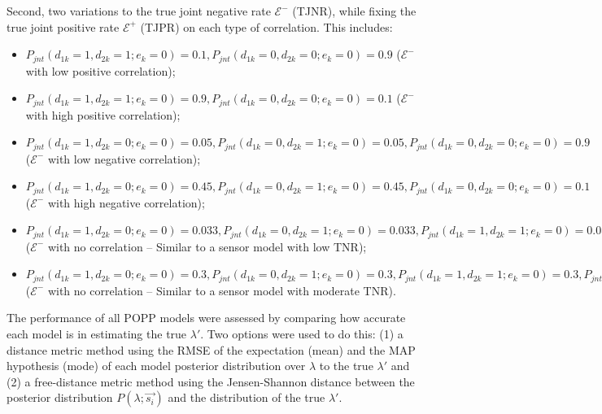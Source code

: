 Second, two variations to the true joint negative rate $\mathcal{E^-}$ (TJNR), while fixing the true joint positive rate $\mathcal{E^+}$ (TJPR) on each type of correlation. This includes: 
\begin{itemize}
	\item $P_{jnt}(d_{1k}=1, d_{2k}=1 ; e_k=0) = 0.1, P_{jnt}(d_{1k}=0, d_{2k}=0 ; e_k=0) = 0.9$ ($\mathcal{E^-}$ with low positive correlation);
	\item $P_{jnt}(d_{1k}=1, d_{2k}=1 ; e_k=0) = 0.9, P_{jnt}(d_{1k}=0, d_{2k}=0 ; e_k=0) = 0.1$ ($\mathcal{E^-}$ with high positive correlation);
	\item $P_{jnt}(d_{1k}=1, d_{2k}=0 ; e_k=0) = 0.05, P_{jnt}(d_{1k}=0, d_{2k}=1 ; e_k=0) = 0.05, P_{jnt}(d_{1k}=0, d_{2k}=0 ; e_k=0) = 0.9$ ($\mathcal{E^-}$ with low negative correlation);
	\item $P_{jnt}(d_{1k}=1, d_{2k}=0 ; e_k=0) = 0.45, P_{jnt}(d_{1k}=0, d_{2k}=1 ; e_k=0) = 0.45, P_{jnt}(d_{1k}=0, d_{2k}=0 ; e_k=0) = 0.1$ ($\mathcal{E^-}$ with high negative correlation);
	\item $P_{jnt}(d_{1k}=1, d_{2k}=0 ; e_k=0) = 0.033, P_{jnt}(d_{1k}=0, d_{2k}=1 ; e_k=0) = 0.033, P_{jnt}(d_{1k}=1, d_{2k}=1 ; e_k=0) = 0.033, P_{jnt}(d_{1k}=0, d_{2k}=0 ; e_k=1) = 0.901$ ($\mathcal{E^-}$ with no correlation -- Similar to a sensor model with low TNR);
	\item $P_{jnt}(d_{1k}=1, d_{2k}=0 ; e_k=0) = 0.3, P_{jnt}(d_{1k}=0, d_{2k}=1 ; e_k=0) = 0.3, P_{jnt}(d_{1k}=1, d_{2k}=1 ; e_k=0) = 0.3, P_{jnt}(d_{1k}=0, d_{2k}=0 ; e_k=1) = 0.1$ ($\mathcal{E^-}$ with no correlation -- Similar to a sensor model with moderate TNR).
\end{itemize}

The performance of all POPP models were assessed by comparing how accurate each model is in estimating the true $\lambda'$. Two options were used to do this: (1) a distance metric method using the RMSE of the expectation (mean) and the MAP hypothesis (mode) of each model posterior distribution over $\lambda$ to the true $\lambda'$ and (2) a free-distance metric method using the Jensen-Shannon distance between the posterior distribution $P(\lambda ; \overrightarrow{s_i})$ and the distribution of the true $\lambda'$. 

